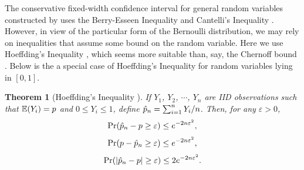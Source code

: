 \documentclass{iitthesis}
\newtheorem{theorem}{Theorem}[section]
\begin{document}
The conservative fixed-width confidence interval for general random variables constructed by  \cite{HJLO12} uses the Berry-Esseen Inequality \cite[Section 4.1]{LB10} and Cantelli's Inequality \cite[Section 6.1]{LB10}. However, in view of the particular form of the Bernoulli distribution, we may rely on inequalities that assume some bound on the random variable.  Here we use Hoeffding's Inequality \cite{H63}, which seems more suitable than, say, the Chernoff bound \cite{chernoff52}.  Below is the a special case of Hoeffding's Inequality for random variables lying in $[0,1]$.
\begin{theorem}[Hoeffding's Inequality {\cite{H63}}] \label{hoeff}
If $Y_1$, $Y_2$, $\cdots$, $Y_n$ are IID observations such that $\mathbb{E}(Y_i)=p$ and $0 \leq Y_i \leq 1$, define $\hat{p}_n=\sum_{i=1}^n Y_i/n$. Then, for any $\varepsilon>0$, 
$$\Pr(\hat{p}_n-p \geq \varepsilon) \leq e^{-2n\varepsilon^2},$$
$$\Pr(p-\hat{p}_n \geq \varepsilon) \leq e^{-2n\varepsilon^2},$$
$$\Pr(\left \lvert \hat{p}_n-p \right \rvert \geq \varepsilon) \leq 2e^{-2n\varepsilon^2}.$$
\end{theorem}
\end{document}

